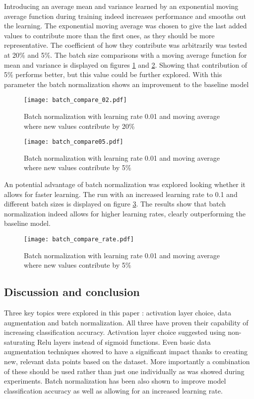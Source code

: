 \documentclass[12pt]{article}
\begin{document}
Introducing an average mean and variance learned by an exponential moving average function during training indeed increases performance and smooths out the learning. The exponential moving average was chosen to give the last added values to contribute more than the first ones, as they should be more representative. The coefficient of how they contribute was arbitrarily was tested at 20\% and 5\%. The batch size comparisons with a moving average function for mean and variance is displayed on figures \ref{fig:batch2} and \ref{fig:batch3}. Showing that contribution of 5\% performs better, but this value could be further explored. With this parameter the batch normalization shows an improvement to the baseline model

\begin{figure}[H]
\centering
\texttt{[image: batch\_compare\_02.pdf]}

  \caption{Batch normalization with learning rate 0.01 and moving average where new values contribute by 20\%}
  \label{fig:batch2}
\end{figure}


\begin{figure}[H]
\centering
\texttt{[image: batch\_compare05.pdf]}

  \caption{Batch normalization with learning rate 0.01 and moving average where new values contribute by 5\%}
  \label{fig:batch3}
\end{figure}


An potential advantage of batch normalization was explored looking whether it allows for faster learning. The run with an increased learning rate to 0.1 and different batch sizes is displayed on figure \ref{fig:batchr}. The results show that batch normalization indeed allows for higher learning rates, clearly outperforming the baseline model.

\begin{figure}[H]
\centering
\texttt{[image: batch\_compare\_rate.pdf]}

  \caption{Batch normalization with learning rate 0.01 and moving average where new values contribute by 5\%}
  \label{fig:batchr}
\end{figure}


\subsection*{Discussion and conclusion}
Three key topics were explored in this paper : activation layer choice, data augmentation and batch normalization. All three have proven their capability of increasing classification accuracy. Activation layer choice suggested using non-saturating Relu layers instead of sigmoid functions. Even basic data augmentation techniques showed to have a significant impact thanks to creating new, relevant data points based on the dataset. More importantly a combination of these should be used rather than just one individually as was showed during experiments. Batch normalization has been also shown to improve model classification accuracy as well as allowing for an increased learning rate.
\end{document}
